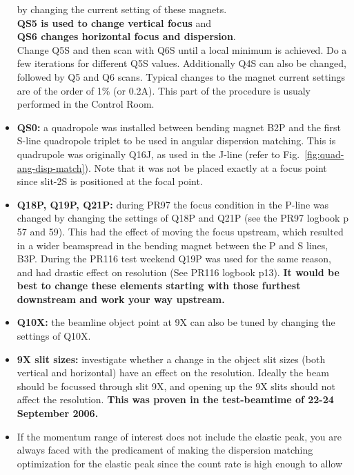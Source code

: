 \documentclass[11pt]{report}
\begin{document}
\begin{itemize}
      by changing the current setting of these magnets.\\
      {\bf QS5 is used to change vertical focus} and \\
      {\bf QS6 changes horizontal focus and dispersion}. \\
	Change Q5S and then scan with  Q6S until a local minimum is achieved. 
      Do a few iterations for different Q5S values.
      Additionally Q4S can also be changed, followed by Q5 and Q6 scans.
      Typical changes to the magnet current settings are of the order of 1\% (or 0.2A).
      This part of the procedure is usualy performed in the Control Room.
\item {\bf QS0:} a quadropole was installed between bending magnet B2P and the 
      first S-line quadropole triplet to be used in angular dispersion matching. 
      This is quadrupole was originally Q16J, as used in the J-line (refer to Fig.~\ref{fig:quad-ang-disp-match}).
      Note that it was not be placed exactly at a focus point since slit-2S is positioned at the focal point.
\item {\bf Q18P, Q19P, Q21P:} during PR97 the focus condition in the P-line was changed 
      by changing the settings of Q18P and Q21P 
      (see the PR97 logbook p 57 and 59). 
      This had the effect of moving the focus upstream, which resulted
      in a wider beamspread in the bending magnet between the P and S lines, B3P.
      During the PR116 test weekend Q19P was used for the same reason, and
      had drastic effect on resolution (See PR116 logbook p13).
      {\bf It would be best to change these elements starting with those furthest downstream and
	work your way upstream.}
\item {\bf Q10X:} the beamline object point at 9X can also be tuned by changing the settings of
      Q10X. 
\item {\bf 9X slit sizes:} investigate whether a change in the object slit sizes (both vertical
      and horizontal) have an effect on the resolution. Ideally the 
      beam should be focussed through slit 9X, and opening up the 9X slits
      should not affect the resolution. 
      {\bf This was proven in the test-beamtime of 22-24 September 2006.}
\item If the momentum range of interest does not include the elastic peak,
      you are always faced with the predicament of making the dispersion matching
      optimization for the elastic peak since the count rate is high enough to allow

\end{itemize}
\end{document}
